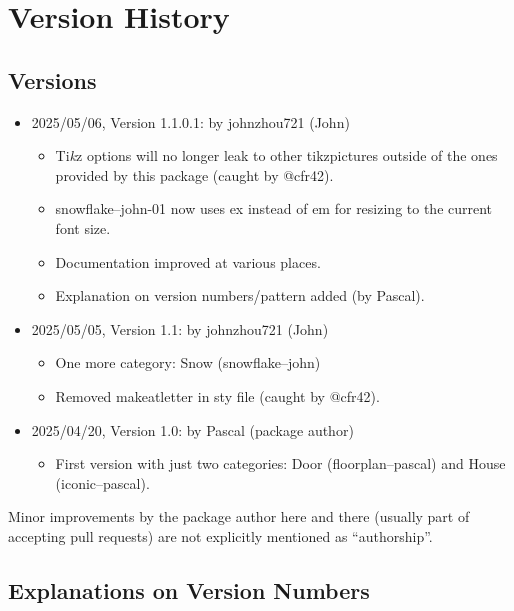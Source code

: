 \documentclass{article}
\begin{document}
\section*{Version History}

\subsection*{Versions}

\begin{itemize}
  \setlength{\parskip}{3pt}
  \item 2025/05/06, Version 1.1.0.1: \hfill by johnzhou721 (John)
  \begin{itemize}
      \item Ti\textit{k}z options will no longer leak to other tikzpictures outside of the ones provided by this package (caught by @cfr42).
      \item snowflake--john-01 now uses ex instead of em for resizing to the current font size.
      \item Documentation improved at various places.
      \item Explanation on version numbers/pattern added (by Pascal).
  \end{itemize}
  \item 2025/05/05, Version 1.1: \hfill by johnzhou721 (John)
  \begin{itemize}
      \item One more category: Snow (snowflake--john)
      \item Removed makeatletter in sty file (caught by @cfr42).
  \end{itemize}
  \item 2025/04/20, Version 1.0: \hfill by Pascal (package author)
  \begin{itemize}
      \item First version with just two categories: Door (floorplan--pascal) and House (iconic--pascal).
  \end{itemize}
\end{itemize}

Minor improvements by the package author here and there (usually part of accepting pull requests) are not explicitly mentioned as ``authorship''.

\subsection*{Explanations on Version Numbers}
\end{document}
